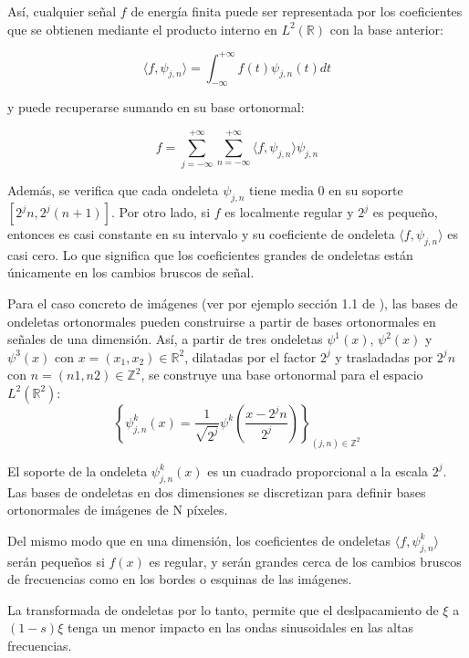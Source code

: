 \noindent Así, cualquier señal $f$ de energía finita puede ser representada por los coeficientes que se obtienen mediante el producto interno en $L^2(\mathbb{R})$ con la base anterior: 

$$\langle f,\psi_{j,n} \rangle =\int_{-\infty}^{+\infty} f(t) \psi_{j,n} (t) dt  $$

\noindent y puede recuperarse sumando en su base ortonormal:

$$f=\sum_{j=-\infty}^{+\infty}\sum_{n=-\infty}^{+\infty}  \langle f,\psi_{j,n} \rangle \psi_{j,n} $$

\noindent Además, se verifica que cada ondeleta $\psi_{j,n}$ tiene media $0$ en su soporte $[2^jn, 2^j(n+1)]$. Por otro lado, si $f$ es localmente regular y $2^j$ es pequeño, entonces es casi constante en su intervalo y su coeficiente de ondeleta $\langle f,\psi_{j,n} \rangle$ es casi cero. Lo que significa que los coeficientes grandes de ondeletas están únicamente en los cambios bruscos de señal.

\medskip

\noindent Para el caso concreto de imágenes (ver por ejemplo sección 1.1 de \cite{MallatWavelets}), las bases de ondeletas ortonormales pueden construirse a partir de bases ortonormales en señales de una dimensión. Así, a partir de tres ondeletas $\psi^1(x)$, $\psi^2(x)$ y$\psi^3(x)$ con $x=(x_1,x_2)\in \mathbb{R}^2$, dilatadas por el factor $2^j$ y trasladadas por $2^jn$ con $n=(n1,n2)\in \mathbb{Z}^2$, se construye una base ortonormal para el espacio $L^2(\mathbb{R}^2)$: 
$$\left \lbrace \psi_{j,n}^k(x)= \frac{1}{\sqrt{2^j}} \psi^k\left(\frac{x-2^jn}{2^j}\right) \right \rbrace_{(j,n) \in \mathbb{Z}^2}$$

\medskip

\noindent El soporte de la ondeleta $\psi_{j,n}^k(x)$ es un cuadrado proporcional a la escala $2^j$. Las bases de ondeletas en dos dimensiones se discretizan para definir bases ortonormales de imágenes de N píxeles.


\noindent Del mismo modo que en una dimensión, los coeficientes de ondeletas $\langle f,\psi_{j,n}^k \rangle$ serán pequeños si $f(x)$ es regular, y serán grandes cerca de los cambios bruscos de frecuencias como en los bordes o esquinas de las imágenes.


\medskip 

\noindent La transformada de ondeletas por lo tanto, permite que el deslpacamiento de $\xi$ a $(1-s)\xi$ tenga un menor impacto en las ondas sinusoidales en las altas frecuencias.

